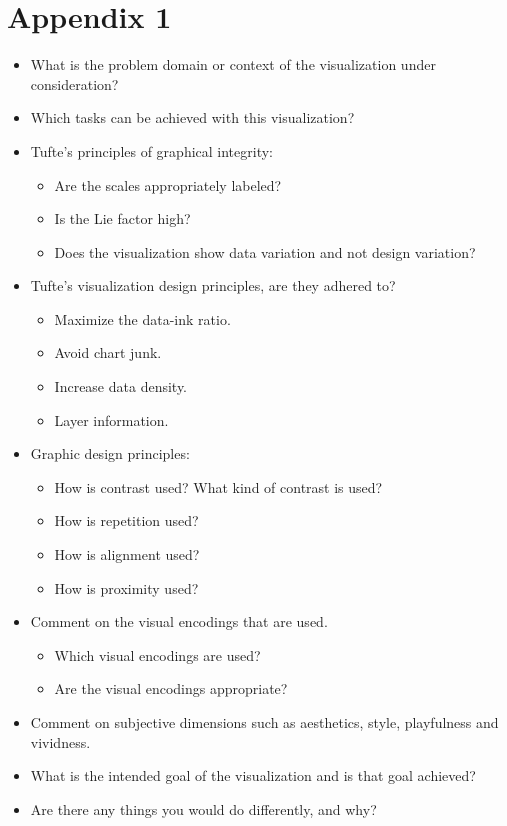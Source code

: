 \section{Appendix 1}

\begin{itemize}[noitemsep]
    \item What is the problem domain or context of the visualization under consideration?
    \item Which tasks can be achieved with this visualization?
    \item Tufte’s principles of graphical integrity:
        \begin{itemize}[noitemsep]
            \item Are the scales appropriately labeled?
            \item Is the Lie factor high?
            \item Does the visualization show data variation and not design variation?
        \end{itemize}
    \item Tufte’s visualization design principles, are they adhered to?
        \begin{itemize}[noitemsep]
            \item Maximize the data-ink ratio.
            \item Avoid chart junk.
            \item Increase data density.
            \item Layer information.
        \end{itemize}
    \item Graphic design principles:
        \begin{itemize}[noitemsep]
            \item How is contrast used? What kind of contrast is used?
            \item How is repetition used?
            \item How is alignment used?
            \item How is proximity used?
        \end{itemize}
    \item Comment on the visual encodings that are used.
        \begin{itemize}[noitemsep]
            \item Which visual encodings are used?
            \item Are the visual encodings appropriate?
        \end{itemize}
    \item Comment on subjective dimensions such as aesthetics, style, playfulness
    and vividness.
    \item What is the intended goal of the visualization and is that goal achieved?
    \item Are there any things you would do differently, and why?
\end{itemize}
